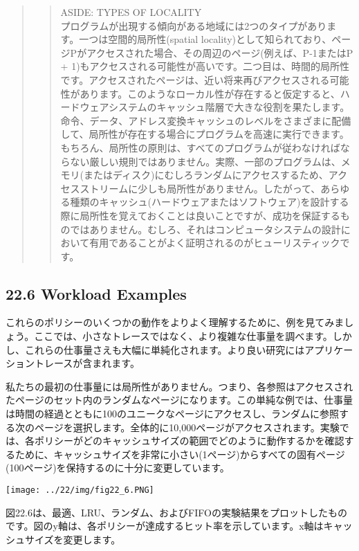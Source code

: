 \begin{quote}
\begin{quote}
ASIDE: TYPES OF LOCALITY\\
プログラムが出現する傾向がある地域には2つのタイプがあります。一つは空間的局所性(spatial
locality)として知られており、ページPがアクセスされた場合、その周辺のページ(例えば、P-1またはP
+
1)もアクセスされる可能性が高いです。二つ目は、時間的局所性です。アクセスされたページは、近い将来再びアクセスされる可能性があります。このようなローカル性が存在すると仮定すると、ハードウェアシステムのキャッシュ階層で大きな役割を果たします。命令、データ、アドレス変換キャッシュのレベルをさまざまに配備して、局所性が存在する場合にプログラムを高速に実行できます。もちろん、局所性の原則は、すべてのプログラムが従わなければならない厳しい規則ではありません。実際、一部のプログラムは、メモリ(またはディスク)にむしろランダムにアクセスするため、アクセスストリームに少しも局所性がありません。したがって、あらゆる種類のキャッシュ(ハードウェアまたはソフトウェア)を設計する際に局所性を覚えておくことは良いことですが、成功を保証するものではありません。むしろ、それはコンピュータシステムの設計において有用であることがよく証明されるのがヒューリスティックです。
\end{quote}
\end{quote}

\hypertarget{workload-examples}{%
\subsection*{22.6 Workload Examples}\label{workload-examples}}

これらのポリシーのいくつかの動作をよりよく理解するために、例を見てみましょう。ここでは、小さなトレースではなく、より複雑な仕事量を調べます。しかし、これらの仕事量さえも大幅に単純化されます。より良い研究にはアプリケーショントレースが含まれます。

私たちの最初の仕事量には局所性がありません。つまり、各参照はアクセスされたページのセット内のランダムなページになります。この単純な例では、仕事量は時間の経過とともに100のユニークなページにアクセスし、ランダムに参照する次のページを選択します。全体的に10,000ページがアクセスされます。実験では、各ポリシーがどのキャッシュサイズの範囲でどのように動作するかを確認するために、キャッシュサイズを非常に小さい(1ページ)からすべての固有ページ(100ページ)を保持するのに十分に変更しています。

\texttt{[image: ../22/img/fig22\_6.PNG]}

図22.6は、最適、LRU、ランダム、およびFIFOの実験結果をプロットしたものです。図のy軸は、各ポリシーが達成するヒット率を示しています。x軸はキャッシュサイズを変更します。

